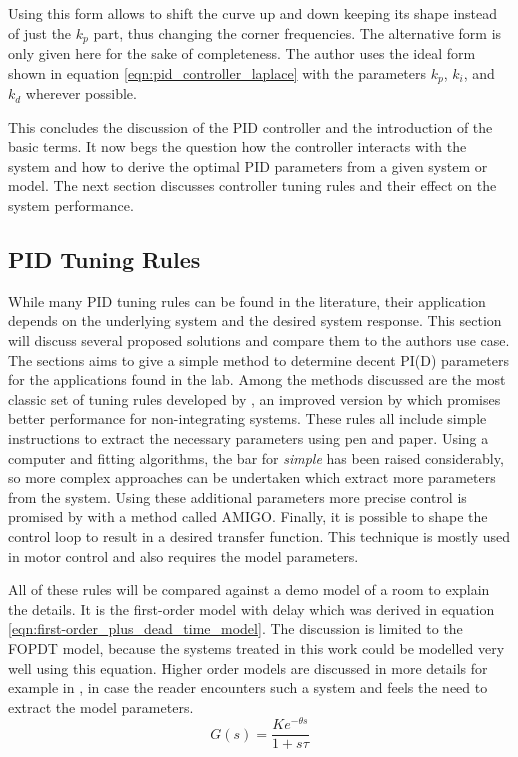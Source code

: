 Using this form allows to shift the curve up and down keeping its shape instead of just the $k_p$ part, thus changing the corner frequencies. The alternative form is only given here for the sake of completeness. The author uses the ideal form shown in equation \ref{eqn:pid_controller_laplace} with the parameters $k_p$, $k_i$, and $k_d$ wherever possible.

This concludes the discussion of the PID controller and the introduction of the basic terms. It now begs the question how the controller interacts with the system and how to derive the optimal PID parameters from a given system or model. The next section discusses controller tuning rules and their effect on the system performance.

\subsection{PID Tuning Rules}%
\label{sec:pid_tuning_rules}
While many PID tuning rules can be found in the literature, their application depends on the underlying system and the desired system response. This section will discuss several proposed solutions and compare them to the authors use case. The sections aims to give a simple method to determine decent PI(D) parameters for the applications found in the lab. Among the methods discussed are the most classic set of tuning rules developed by \citeauthor{ziegler_nichols} \cite{ziegler_nichols}, an improved version by \citeauthor{simc_paper} \cite{simc_paper} which promises better performance for non-integrating systems. These rules all include simple instructions to extract the necessary parameters using pen and paper. Using a computer and fitting algorithms, the bar for \textit{simple} has been raised considerably, so more complex approaches can be undertaken which extract more parameters from the system. Using these additional parameters more precise control is promised by \citeauthor{pid_basics} \cite{pid_basics, advanced_pid_control} with a method called AMIGO. Finally, it is possible to shape the control loop to result in a desired transfer function. This technique is mostly used in motor control \cite{pid_controller,advanced_pid_control} and also requires the model parameters.

All of these rules will be compared against a demo model of a room to explain the details. It is the first-order model with delay which was derived in equation \ref{eqn:first-order_plus_dead_time_model}. The discussion is limited to the FOPDT model, because the systems treated in this work could be modelled very well using this equation. Higher order models are discussed in more details for example in \cite{advanced_pid_control,pid_controller,simc_paper}, in case the reader encounters such a system and feels the need to extract the model parameters.
\begin{equation}
    G(s) = \frac{K e^{-\theta s}}{1 + s \tau} \label{eqn:demo_process_model}
\end{equation}

